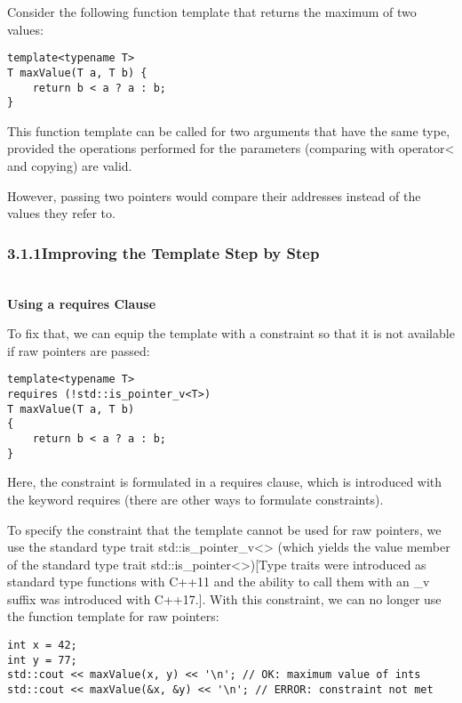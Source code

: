 

Consider the following function template that returns the maximum of two values:

\begin{lstlisting}[style=styleCXX]
template<typename T>
T maxValue(T a, T b) {
	return b < a ? a : b;
}
\end{lstlisting}

This function template can be called for two arguments that have the same type, provided the operations performed for the parameters (comparing with operator< and copying) are valid.

However, passing two pointers would compare their addresses instead of the values they refer to.

\subsubsection*{ 3.1.1\hspace{0.2cm}Improving the Template Step by Step}

\noindent
\hspace*{\fill} \\ %
\textbf{Using a requires Clause}


To fix that, we can equip the template with a constraint so that it is not available if raw pointers are passed:

\begin{lstlisting}[style=styleCXX]
template<typename T>
requires (!std::is_pointer_v<T>)
T maxValue(T a, T b)
{
	return b < a ? a : b;
}
\end{lstlisting}

Here, the constraint is formulated in a requires clause, which is introduced with the keyword requires (there are other ways to formulate constraints).

To specify the constraint that the template cannot be used for raw pointers, we use the standard type trait std::is\_pointer\_v<> (which yields the value member of the standard type trait std::is\_pointer<>)[Type traits were introduced as standard type functions with C++11 and the ability to call them with an \_v suffix was introduced with C++17.]. With this constraint, we can no longer use the function template for raw pointers:

\begin{lstlisting}[style=styleCXX]
int x = 42;
int y = 77;
std::cout << maxValue(x, y) << '\n'; // OK: maximum value of ints
std::cout << maxValue(&x, &y) << '\n'; // ERROR: constraint not met
\end{lstlisting}

